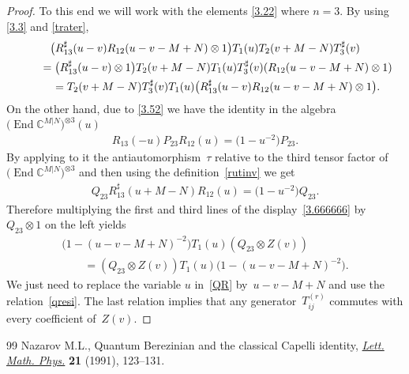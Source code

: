 \documentclass[10pt,a4paper]{amsart}
\numberwithin{equation}{section}
\def\CC{{\mathbb{C}}}
\def\CMN{\CC^{M|N}}
\def\End{\operatorname{End}}
\def\ot{\otimes}
\def\RS{R^{\sharp}}
\def\TS{T^{\sharp}}
\begin{document}
\begin{proof}
To this end we will work with the elements \eqref{3.22}
where $n=3 $. By using \eqref{3.3} and \eqref{trater},
\begin{gather}
\big(\RS_{13}(u-v) R_{12}(u-v-M+N)\ot1\big)
T_1(u) T_2(v+M-N) \TS_3(v)
\notag
\\
\qquad{}=\big(\RS_{13}(u-v)\ot1\big)
T_2(v+M-N) T_1(u) \TS_3(v)
(R_{12}(u-v-M+N)\ot1)
\notag
\\
\qquad{} =T_2(v+M-N) \TS_3(v) T_1(u)
\big(\RS_{13}(u-v) R_{12}(u-v-M+N)\ot1\big) .\label{3.666666}
\end{gather}
On the other hand, due to \eqref{3.52} we have the identity in the algebra
$\big(\End\CMN\big)^{\ot 3}( u )$
\begin{gather*}
R_{13}(-u) P_{23} R_{12}(u)=\big( 1-u^{-2} \big) P_{23} .
\end{gather*}
By applying to it the antiautomorphism~$\tau$
relative to the third tensor factor of $\big(\End\CMN\big)^{\ot 3}$
and then using the definition~\eqref{rutinv} we get
\begin{gather}\label{QR}
Q_{23} \RS_{13}(u+M-N) R_{12}(u)=\big( 1-u^{-2} \big) Q_{23} .
\end{gather}
Therefore multiplying the first and third lines of the display~\eqref{3.666666} by $Q_{23}\ot1$ on the left yields
\begin{gather*}
\big( 1-(u-v-M+N)^{-2} \big)
T_1(u) (Q_{23}\ot Z(v))\\
\qquad{} = (Q_{23}\ot Z(v)) T_1(u)\big( 1-(u-v-M+N)^{-2} \big) .
\end{gather*}
We just need to replace the variable $u$ in~\eqref{QR} by~$u-v-M+N$
and use the relation~\eqref{qresi}.
The last relation implies that any generator~$T_{ij}^{(r)}$
commutes with every coefficient of~$Z(v)$.
\end{proof}

\begin{thebibliography}{99}
Nazarov M.L., Quantum {B}erezinian and the classical {C}apelli identity,
 \href{https://doi.org/10.1007/BF00401646}{\textit{Lett. Math. Phys.}} \textbf{21} (1991), 123--131.
\end{thebibliography}
\end{document}
